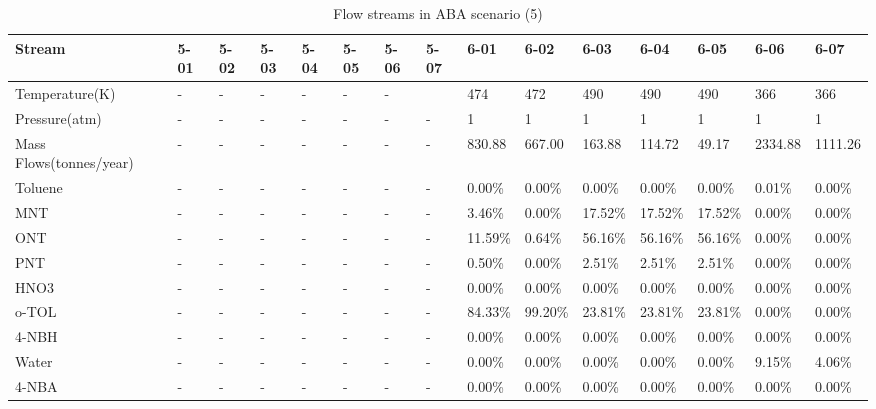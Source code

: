 \begin{landscape}
\begin{table}[H]
\centering
\caption{Flow streams in ABA scenario (5)}
\label{ABAFST5}
\begin{tabular}{|l|l|l|l|l|l|l|l|l|l|l|l|l|l|l|}
\hline
\textbf{Stream}         & 5-01 & 5-02 & 5-03 & 5-04 & 5-05 & 5-06 & 5-07 & 6-01    & 6-02    & 6-03    & 6-04    & 6-05    & 6-06    & 6-07    \\ \hline
Temperature(K)          & -    & -    & -    & -    & -    & -    &      & 474     & 472     & 490     & 490     & 490     & 366     & 366     \\ \hline
Pressure(atm)           & -    & -    & -    & -    & -    & -    & -    & 1       & 1       & 1       & 1       & 1       & 1       & 1       \\ \hline
Mass Flows(tonnes/year) & -    & -    & -    & -    & -    & -    & -    & 830.88  & 667.00  & 163.88  & 114.72  & 49.17   & 2334.88 & 1111.26 \\ \hline
Toluene                 & -    & -    & -    & -    & -    & -    & -    & 0.00\%  & 0.00\%  & 0.00\%  & 0.00\%  & 0.00\%  & 0.01\%  & 0.00\%  \\ \hline
MNT                     & -    & -    & -    & -    & -    & -    & -    & 3.46\%  & 0.00\%  & 17.52\% & 17.52\% & 17.52\% & 0.00\%  & 0.00\%  \\ \hline
ONT                     & -    & -    & -    & -    & -    & -    & -    & 11.59\% & 0.64\%  & 56.16\% & 56.16\% & 56.16\% & 0.00\%  & 0.00\%  \\ \hline
PNT                     & -    & -    & -    & -    & -    & -    & -    & 0.50\%  & 0.00\%  & 2.51\%  & 2.51\%  & 2.51\%  & 0.00\%  & 0.00\%  \\ \hline
HNO3                    & -    & -    & -    & -    & -    & -    & -    & 0.00\%  & 0.00\%  & 0.00\%  & 0.00\%  & 0.00\%  & 0.00\%  & 0.00\%  \\ \hline
o-TOL                   & -    & -    & -    & -    & -    & -    & -    & 84.33\% & 99.20\% & 23.81\% & 23.81\% & 23.81\% & 0.00\%  & 0.00\%  \\ \hline
4-NBH                   & -    & -    & -    & -    & -    & -    & -    & 0.00\%  & 0.00\%  & 0.00\%  & 0.00\%  & 0.00\%  & 0.00\%  & 0.00\%  \\ \hline
Water                   & -    & -    & -    & -    & -    & -    & -    & 0.00\%  & 0.00\%  & 0.00\%  & 0.00\%  & 0.00\%  & 9.15\%  & 4.06\%  \\ \hline
4-NBA                   & -    & -    & -    & -    & -    & -    & -    & 0.00\%  & 0.00\%  & 0.00\%  & 0.00\%  & 0.00\%  & 0.00\%  & 0.00\%  \\ \hline

\end{tabular}
\end{table}
\end{landscape}
